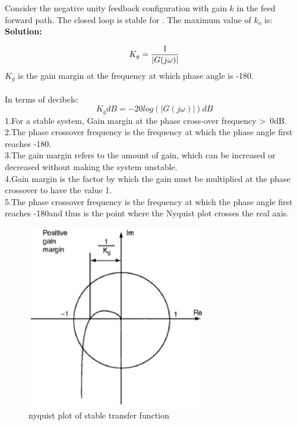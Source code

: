 \begin{enumerate}[label=\thesection.\arabic*.,ref=\thesection.\theenumi]
\begin{figure}[h]
\end{figure}

 Consider the negative unity feedback configuration with gain $k$ in the feed forward path. The closed loop is stable for  . 
    The maximum value of $k_o$  is: \\


\textbf{ Solution:}

\begin{equation}
   \\ K_g = \frac{1}{|G(j\omega)|}
\end{equation} 
$K_g$ is the gain margin
at the frequency at which phase angle
is -180\degree.
\\\\ 
In terms of decibels: 
\begin{equation}
    K_g dB = -20log(|G(j\omega)|) dB
\end{equation}
1.For a stable system, Gain margin at the phase cross-over frequency \textgreater \ 0dB. \\
2.The phase crossover frequency is the frequency at which the phase angle first reaches -180\degree. \\
3.The gain margin refers to the amount of gain, which can be increased or decreased without making the system unstable. \\
4.Gain margin is the factor by which the gain must be multiplied at the phase crossover to have the value 1. \\
5.The phase crossover frequency is the frequency at which the phase angle first reaches -180\degree and thus is the point where the Nyquist plot crosses the real axis. \\
\begin{figure}[h]
    \centering
    \includegraphics[width=1.02\linewidth, height=8cm]{./figs/1.eps}
    \caption{nyquist plot of stable transfer function}
\end{figure}


\end{enumerate}
